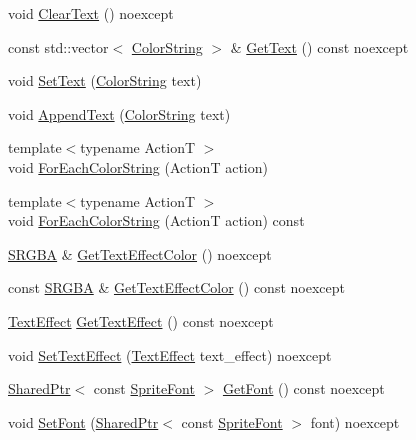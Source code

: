 \begin{DoxyCompactItemize}
\item 
void \hyperlink{classmage_1_1_sprite_text_add6f3e1150dc041d999dba772e43be14}{Clear\+Text} () noexcept
\item 
const std\+::vector$<$ \hyperlink{classmage_1_1_color_string}{Color\+String} $>$ \& \hyperlink{classmage_1_1_sprite_text_a035a18c8c388649f38a6a62e3cbcc18a}{Get\+Text} () const noexcept
\item 
void \hyperlink{classmage_1_1_sprite_text_a6853a914502bb28cfc4dc14160345542}{Set\+Text} (\hyperlink{classmage_1_1_color_string}{Color\+String} text)
\item 
void \hyperlink{classmage_1_1_sprite_text_ae401ba9ddbb1e53e84fb24f4bd4f11bb}{Append\+Text} (\hyperlink{classmage_1_1_color_string}{Color\+String} text)
\item 
{\footnotesize template$<$typename ActionT $>$ }\\void \hyperlink{classmage_1_1_sprite_text_ad975957b908ad3926ace75fb60ff4474}{For\+Each\+Color\+String} (ActionT action)
\item 
{\footnotesize template$<$typename ActionT $>$ }\\void \hyperlink{classmage_1_1_sprite_text_abc70368fd800a82cbd1ec31f51d4db17}{For\+Each\+Color\+String} (ActionT action) const
\item 
\hyperlink{structmage_1_1_s_r_g_b_a}{S\+R\+G\+BA} \& \hyperlink{classmage_1_1_sprite_text_a0b8d0df75efa9dd9e666b68db6ee71b5}{Get\+Text\+Effect\+Color} () noexcept
\item 
const \hyperlink{structmage_1_1_s_r_g_b_a}{S\+R\+G\+BA} \& \hyperlink{classmage_1_1_sprite_text_af9f15b5b215e1433cee2152a5ce5e299}{Get\+Text\+Effect\+Color} () const noexcept
\item 
\hyperlink{classmage_1_1_sprite_text_ac60331e941d1f76551b7bdfad6ee7324}{Text\+Effect} \hyperlink{classmage_1_1_sprite_text_a1f5b83df9a7332ac3774a038df169847}{Get\+Text\+Effect} () const noexcept
\item 
void \hyperlink{classmage_1_1_sprite_text_ae258a31796c3fa6b8c31e0b98010a0ef}{Set\+Text\+Effect} (\hyperlink{classmage_1_1_sprite_text_ac60331e941d1f76551b7bdfad6ee7324}{Text\+Effect} text\+\_\+effect) noexcept
\item 
\hyperlink{namespacemage_a1e01ae66713838a7a67d30e44c67703e}{Shared\+Ptr}$<$ const \hyperlink{classmage_1_1_sprite_font}{Sprite\+Font} $>$ \hyperlink{classmage_1_1_sprite_text_aa1aab1690f37220babce2639463bd7d5}{Get\+Font} () const noexcept
\item 
void \hyperlink{classmage_1_1_sprite_text_a46235c90d3fc9872c2342cd17eaa9e89}{Set\+Font} (\hyperlink{namespacemage_a1e01ae66713838a7a67d30e44c67703e}{Shared\+Ptr}$<$ const \hyperlink{classmage_1_1_sprite_font}{Sprite\+Font} $>$ font) noexcept
\end{DoxyCompactItemize}
